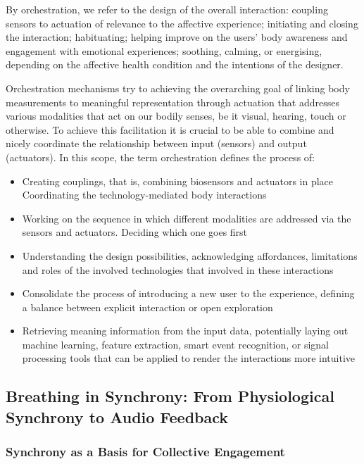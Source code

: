 By orchestration, we refer to the design of the overall interaction: coupling sensors to actuation of relevance to the affective experience; initiating and closing the interaction; habituating; helping improve on the users' body awareness and engagement with emotional experiences; soothing, calming, or energising, depending on the affective health condition and the intentions of the designer. 

Orchestration mechanisms try to achieving the overarching goal of linking body measurements to meaningful representation through actuation that addresses various modalities that act on our bodily senses, be it visual, hearing, touch or otherwise. To achieve this facilitation it is crucial to be able to combine and nicely coordinate the relationship between input (sensors) and output (actuators). In this scope, the term orchestration defines the process of: 
\begin{itemize}
    \item Creating couplings, that is, combining biosensors and actuators in place 
    Coordinating the technology-mediated body interactions 
    \item Working on the sequence in which different modalities are addressed via the sensors and actuators. Deciding which one goes first 
    \item Understanding the design possibilities, acknowledging affordances, limitations and roles of the involved technologies that involved in these interactions 
    \item Consolidate the process of introducing a new user to the experience, defining a balance between explicit interaction or open exploration
    \item Retrieving meaning information from the input data, potentially laying out machine learning, feature extraction, smart event recognition, or signal processing tools that can be applied to render the interactions more intuitive
\end{itemize}

\subsection{Breathing in Synchrony: From Physiological Synchrony to Audio Feedback}

\subsubsection{Synchrony as a Basis for Collective Engagement}

